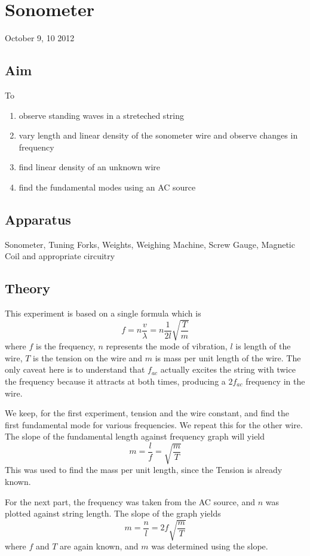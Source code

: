 \chapter{Sonometer}
\begin{flushright}
October 9, 10 2012
\end{flushright}
\section{Aim}
	To 
	\begin{enumerate}
		\item observe standing waves in a streteched string
		\item vary length and linear density of the sonometer wire and observe changes in frequency
		\item find linear density of an unknown wire
		\item find the fundamental modes using an AC source
	\end{enumerate}

	\section{Apparatus}
	Sonometer, Tuning Forks, Weights, Weighing Machine, Screw Gauge, Magnetic Coil and appropriate circuitry

\section{Theory}
	This experiment is based on a single formula which is
	\begin{equation}
		f=n\frac{v}{\lambda}=n\frac{1}{2l}\sqrt{\frac{T}{m}}
	\end{equation}
	where $f$ is the frequency, $n$ represents the mode of vibration, $l$ is length of the wire, $T$ is the tension on the wire and $m$ is mass per unit length of the wire. The only caveat here is to understand that $f_{ac}$ actually excites the string with twice the frequency because it attracts at both times, producing a $2f_{ac}$ frequency in the wire.
	\par
	We keep, for the first experiment, tension and the wire constant, and find the first fundamental mode for various frequencies. We repeat this for the other wire. The slope of the fundamental length against frequency graph will yield
	\begin{equation}
		m=\frac{l}{f}=\sqrt{\frac{m}{T}}
	\end{equation}
	This was used to find the mass per unit length, since the Tension is already known.	
	\par
	For the next part, the frequency was taken from the AC source, and $n$ was plotted against string length. The slope of the graph yields
	\begin{equation}
		m=\frac{n}{l}=2f\sqrt{\frac{m}{T}}
	\end{equation}
	where $f$ and $T$ are again known, and $m$ was determined using the slope.

